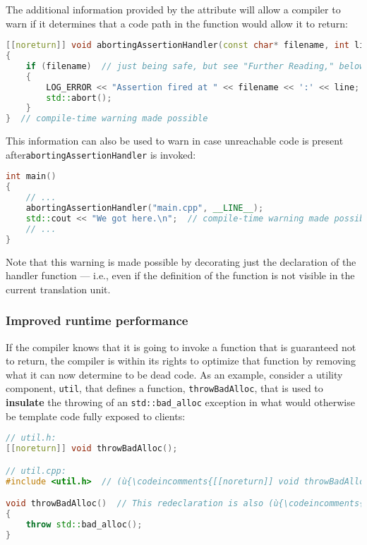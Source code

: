 \noindent The additional information provided by the attribute will allow a
compiler to warn if it determines that a code path in the
function would allow it to return:

\begin{lstlisting}[language=C++]
[[noreturn]] void abortingAssertionHandler(const char* filename, int line)
{
    if (filename)  // just being safe, but see "Further Reading," below
    {
        LOG_ERROR << "Assertion fired at " << filename << ':' << line;
        std::abort();
    }
}  // compile-time warning made possible
\end{lstlisting}
    

\noindent This information can also be used to warn in case unreachable code is
present after\linebreak[4] \texttt{abortingAssertionHandler} is invoked:

\begin{lstlisting}[language=C++]
int main()
{
    // ...
    abortingAssertionHandler("main.cpp", __LINE__);
    std::cout << "We got here.\n";  // compile-time warning made possible
    // ...
}
\end{lstlisting}
    

\noindent Note that this warning is made possible by decorating just the
declaration of the handler function --- i.e., even if the definition of
the function is not visible in the current translation unit.

\subsubsection[Improved runtime performance]{Improved runtime performance}\label{improved-runtime-performance}

If the compiler knows that it is going to invoke a function
that is guaranteed not to return, the compiler is within its rights to optimize
that function by removing what it can now determine to be dead code. As
an example, consider a utility component, \texttt{util}, that defines a
function, \texttt{throwBadAlloc}, that is used to \textbf{insulate} the
throwing of an \texttt{std::bad\_alloc} exception in what would
otherwise be template code fully exposed to clients:

\begin{lstlisting}[language=C++]
// util.h:
[[noreturn]] void throwBadAlloc();

// util.cpp:
#include <util.h>  // (ù{\codeincomments{[[noreturn]] void throwBadAlloc()}}ù)

void throwBadAlloc()  // This redeclaration is also (ù{\codeincomments{[[noreturn]]}}ù).
{
    throw std::bad_alloc();
}
\end{lstlisting}
    

